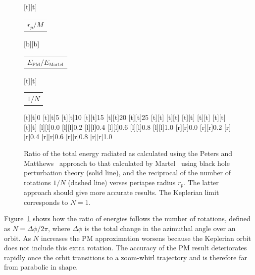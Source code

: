 \documentclass[aps,prd,amsfonts,amssymb,amsmath,nofootinbib,floatfix,reprint,showpacs,groupedaddress]{revtex4-1}
\newcommand{\Figref}[1]{Figure~\ref{fig:#1}}
\begin{document}
\begin{figure}
\begin{psfrags}%
\psfragscanon%
%
[t][t]{\color[rgb]{0,0,0}\setlength{\tabcolsep}{0pt}\begin{tabular}{c}{\Large$r_p/M$}\end{tabular}}%
[b][b]{\color[rgb]{0,0,0}\setlength{\tabcolsep}{0pt}\begin{tabular}{c}{\Large$E_\text{PM}/E_\text{Martel}$}\end{tabular}}%
[t][t]{\color[rgb]{0,0,0}\setlength{\tabcolsep}{0pt}\begin{tabular}{c}{\Large$1/N$}\end{tabular}}%
%
[t][t]{0}%
[t][t]{5}%
[t][t]{10}%
[t][t]{15}%
[t][t]{20}%
[t][t]{25}%
[t][t]{}%
[t][t]{}%
[t][t]{}%
[t][t]{}%
[t][t]{}%
[t][t]{}%
%
[l][l]{0.0}%
[l][l]{0.2}%
[l][l]{0.4}%
[l][l]{0.6}%
[l][l]{0.8}%
[l][l]{1.0}%
[r][r]{0.0}%
[r][r]{0.2}%
[r][r]{0.4}%
[r][r]{0.6}%
[r][r]{0.8}%
[r][r]{1.0}%
%
%
\end{psfrags}%
\caption{Ratio of the total energy radiated as calculated using the Peters and Matthews~\cite{Peters1963} approach to that calculated by Martel~\cite{Martel2004a} using black hole perturbation theory (solid line), and the reciprocal of the number of rotations $1/N$ (dashed line) verses periapse radius $r_{p}$. The latter approach should give more accurate results. The Keplerian limit corresponds to $N = 1$.\label{fig:Ratio}}
\end{figure}
\Figref{Ratio} shows how the ratio of energies follows the number of rotations, defined as $N = {\Delta \phi}/{2\pi}$, where $\Delta \phi$ is the total change in the azimuthal angle over an orbit. As $N$ increases the PM approximation worsens because the Keplerian orbit does not include this extra rotation. The accuracy of the PM result deteriorates rapidly once the orbit transitions to a zoom-whirl trajectory and is therefore far from parabolic in shape.
\end{document}
